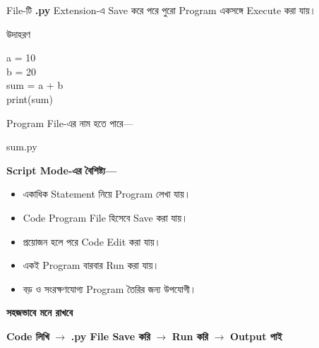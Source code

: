 File-টি
\textbf{\textenglish{\ttfamily .py}}
Extension-এ Save করে পরে পুরো Program একসঙ্গে Execute করা যায়।

\begin{examplebox}{উদাহরণ}

\begin{codebox}

\begin{english}
\ttfamily
a = 10\\
b = 20\\
sum = a + b\\
print(sum)
\end{english}

\end{codebox}

Program File-এর নাম হতে পারে—

\begin{codebox}

\begin{english}
\ttfamily
sum.py
\end{english}

\end{codebox}

\end{examplebox}

\textbf{Script Mode-এর বৈশিষ্ট্য—}

\begin{itemize}

\item একাধিক Statement নিয়ে Program লেখা যায়।

\item Code Program File হিসেবে Save করা যায়।

\item প্রয়োজন হলে পরে Code Edit করা যায়।

\item একই Program বারবার Run করা যায়।

\item বড় ও সংরক্ষণযোগ্য Program তৈরির জন্য উপযোগী।

\end{itemize}

\begin{rememberbox}

\textbf{\color{deepOrange}সহজভাবে মনে রাখবে}

\begin{center}

\textbf{Code লিখি}
\(\longrightarrow\)
\textbf{\textenglish{\ttfamily .py} File Save করি}
\(\longrightarrow\)
\textbf{Run করি}
\(\longrightarrow\)
\textbf{Output পাই}

\end{center}

\end{rememberbox}


